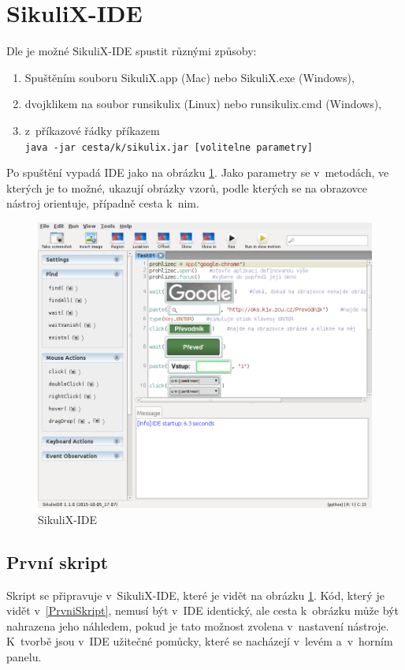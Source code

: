	\section{SikuliX-IDE}
	Dle \citep{SikuliX} je možné SikuliX-IDE spustit různými způsoby:
	\begin{enumerate}
		\item Spuštěním souboru SikuliX.app (Mac) nebo SikuliX.exe (Windows),
		\item dvojklikem na soubor runsikulix (Linux) nebo runsikulix.cmd (Windows),
		\item z~příkazové řádky příkazem\\
		\texttt{java -jar cesta/k/sikulix.jar [volitelne parametry]}
	\end{enumerate}
	Po spuštění vypadá IDE jako na obrázku \ref{SikuliXIDE}. Jako parametry se v~metodách, ve kterých je to možné, ukazují obrázky vzorů, podle kterých se na obrazovce nástroj orientuje, případně cesta k~nim.
	\begin{figure}[ht!]
		\centering
		\caption{SikuliX-IDE}
		\label{SikuliXIDE}
		\includegraphics[width=13.5cm]{img/SikuliXIDE.png}
	\end{figure}
	
		\subsection{První skript}
		Skript se připravuje v~SikuliX-IDE, které je vidět na obrázku \ref{SikuliXIDE}. Kód, který je vidět v~\ref{PrvniSkript}, nemusí být v~IDE identický, ale cesta k~obrázku může být nahrazena jeho náhledem, pokud je tato možnost zvolena v~nastavení nástroje. K~tvorbě jsou v~IDE užitečné pomůcky, které se nacházejí v~levém a~v~horním panelu.
		
